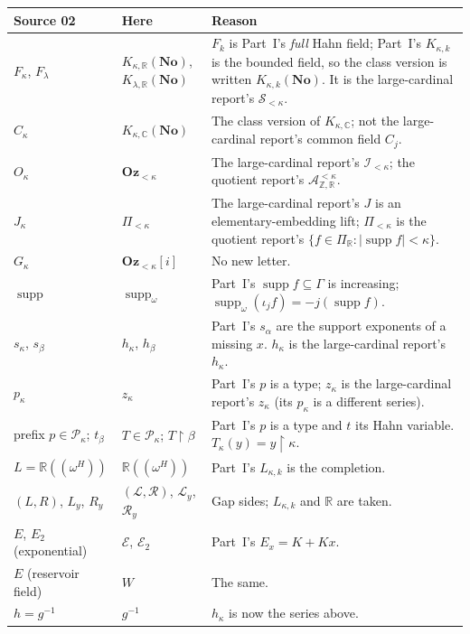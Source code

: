\documentclass[11pt,letterpaper]{article}
\numberwithin{equation}{section}
\theoremstyle{definition}
\theoremstyle{remark}
\newcommand{\R}{\mathbb R}
\newcommand{\C}{\mathbb C}
\newcommand{\No}{\mathbf{No}}
\newcommand{\supp}{\operatorname{supp}}
\newcommand{\K}{K_{\kappa,k}}
\newcommand{\KC}{K_{\kappa,\C}}
\newcommand{\Z}{\mathbb Z}
\newcommand{\Oz}{\mathbf{Oz}}
\newcommand{\suppw}{\operatorname{supp}_{\omega}}
\newcommand{\restr}{\mathbin{\upharpoonright}}
\newcommand{\card}[1]{\lvert #1\rvert}
\newcommand{\KN}[2]{K_{#1,#2}(\No)}%
\newcommand{\Ok}{\Oz_{<\kappa}}
\newcommand{\Pk}{\Pi_{<\kappa}}
\begin{document}
\begin{center}
\small
\begin{longtable}{@{}>{\raggedright\arraybackslash}p{}>{\raggedright\arraybackslash}p{}>{\raggedright\arraybackslash}p{}@{}}
\toprule
Source 02 & Here & Reason \\
\midrule\endhead
$F_\kappa$, $F_\lambda$ & $\KN\kappa\R$, $\KN\lambda\R$ & $F_k$ is Part~I's \emph{full} Hahn field; Part~I's $\K$ is the bounded field, so the class version is written $K_{\kappa,k}(\No)$. It is the large-cardinal report's $\mathscr S_{<\kappa}$. \\
$C_\kappa$ & $\KN\kappa\C$ & The class version of $\KC$; not the large-cardinal report's common field $C_j$. \\
$O_\kappa$ & $\Ok$ & The large-cardinal report's $\mathscr I_{<\kappa}$; the quotient report's $\mathcal A^{<\kappa}_{\Z,\R}$. \\
$J_\kappa$ & $\Pk$ & The large-cardinal report's $J$ is an elementary-embedding lift; $\Pk$ is the quotient report's $\{f\in\Pi_\R:\card{\supp f}<\kappa\}$. \\
$G_\kappa$ & $\Ok[i]$ & No new letter. \\
$\supp$ & $\suppw$ & Part~I's $\supp f\subseteq\Gamma$ is increasing; $\suppw(\iota_j f)=-j(\supp f)$. \\
$s_\kappa$, $s_\beta$ & $h_\kappa$, $h_\beta$ & Part~I's $s_\alpha$ are the support exponents of a missing $x$. $h_\kappa$ is the large-cardinal report's $h_\kappa$. \\
$p_\kappa$ & $z_\kappa$ & Part~I's $p$ is a type; $z_\kappa$ is the large-cardinal report's $z_\kappa$ (its $p_\kappa$ is a different series). \\
prefix $p\in\mathcal P_\kappa$; $t_\beta$ & $T\in\mathcal P_\kappa$; $T\restr\beta$ & Part~I's $p$ is a type and $t$ its Hahn variable. $T_\kappa(y)=y\restr\kappa$. \\
$L=\R((\omega^H))$ & $\R((\omega^H))$ & Part~I's $L_{\kappa,k}$ is the completion. \\
$(L,R)$, $L_y$, $R_y$ & $(\mathcal L,\mathcal R)$, $\mathcal L_y$, $\mathcal R_y$ & Gap sides; $L_{\kappa,k}$ and $\R$ are taken. \\
$E$, $E_2$ (exponential) & $\mathcal E$, $\mathcal E_2$ & Part~I's $E_x=K+Kx$. \\
$E$ (reservoir field) & $W$ & The same. \\
$h=g^{-1}$ & $g^{-1}$ & $h_\kappa$ is now the series above. \\

\end{longtable}
\end{center}
\end{document}
